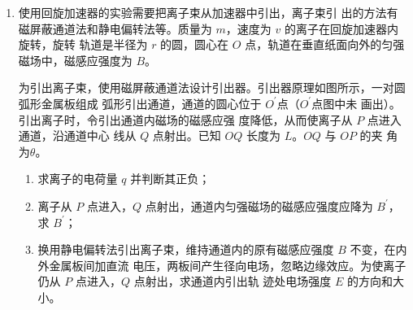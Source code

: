 \begin{enumerate}
\item 
{}
使用回旋加速器的实验需要把离子束从加速器中引出，离子束引
出的方法有磁屏蔽通道法和静电偏转法等。质量为 $ m $，速度为 $ v $ 的离子在回旋加速器内旋转，旋转
轨道是半径为 $ r $ 的圆，圆心在 $ O $ 点，轨道在垂直纸面向外的匀强磁场中，磁感应强度为 $ B $。

为引出离子束，使用磁屏蔽通道法设计引出器。引出器原理如图所示，一对圆弧形金属板组成
弧形引出通道，通道的圆心位于 $ O ^{\prime} $点（$ O ^{\prime} $点图中未
画出）。引出离子时，令引出通道内磁场的磁感应强
度降低，从而使离子从 $ P $ 点进入通道，沿通道中心
线从 $ Q $ 点射出。已知 $ OQ $ 长度为 $ L $。$ OQ $ 与 $ OP $ 的夹
角为$ \theta $。
\begin{enumerate}
	\item
求离子的电荷量 $ q $ 并判断其正负；



\item 
离子从 $ P $ 点进入，$ Q $ 点射出，通道内匀强磁场的磁感应强度应降为 $ B ^{\prime} $，求 $ B ^{\prime} $；

\item 
换用静电偏转法引出离子束，维持通道内的原有磁感应强度 $ B $ 不变，在内外金属板间加直流
电压，两板间产生径向电场，忽略边缘效应。为使离子仍从 $ P $ 点进入，$ Q $ 点射出，求通道内引出轨
迹处电场强度 $ E $ 的方向和大小。

\end{enumerate}
\begin{figure}[h!]
	\flushright
	
\end{figure}





\end{enumerate}
